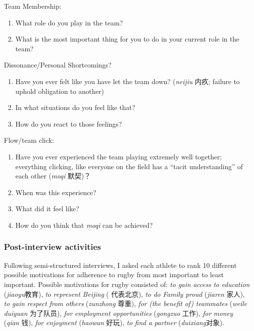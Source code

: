 \begin{CJK}{UTF8}{gbsn}
Team Membership:
\begin{enumerate}
  \item What role do you play in the team?
  \item What is the most important thing for you to do in your current role in the team?
\end{enumerate}


Dissonance/Personal Shortcomings?
\begin{enumerate}
  \item Have you ever felt like you have let the team down?  (\textit{neijiu} 内疚; failure to uphold obligation to another)
  \item In what situations do you feel like that?
  \item How do you react to those feelings?
\end{enumerate}

Flow/team click:
\begin{enumerate}
  \item Have you ever experienced the team playing extremely well together; everything clicking, like everyone on the field has a ``tacit understanding'' of each other (\textit{moqi} 默契)？
  \item When was this experience?
  \item What did it feel like?
  \item How do you think that \textit{moqi} can be achieved?
\end{enumerate}


\subsubsection{Post-interview activities\label{sect:postInterview}}

   Following semi-structured interviews, I asked each athlete to rank 10 different possible motivations for adherence to rugby from most important to least important. Possible motivations for rugby consisted of:
   \textit{to gain access to education} (\textit{jiaoyu}教育), \textit{to represent Beijing} ( 代表北京), \textit{to do Family proud} (\textit{jiaren} 家人), \textit{to gain respect from others} (\textit{zunzhong} 尊重), \textit{for (the benefit of) teammates} (\textit{weile duiyuan} 为了队员), \textit{for employment opportunities} (\textit{gongzuo} 工作), \textit{for money} (\textit{qian} 钱), \textit{for enjoyment} (\textit{haowan} 好玩), \textit{to find a partner} (\textit{duixiang}对象).


\end{CJK}
